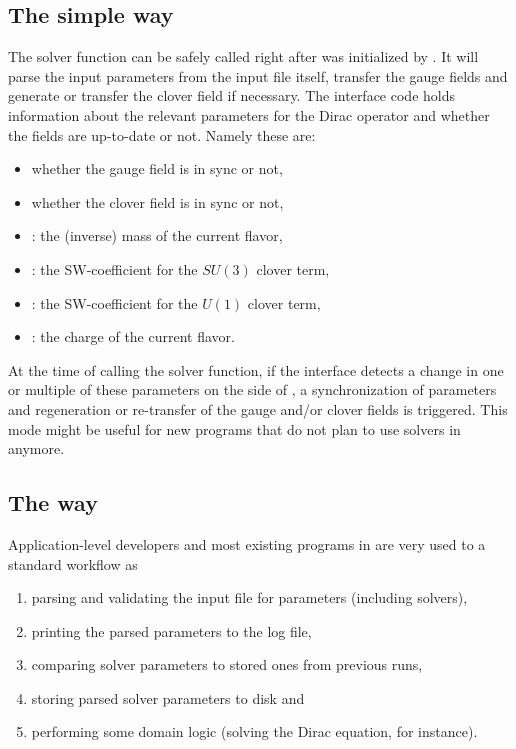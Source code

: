 \subsection{The simple way}
\label{sec:develop:sync:way}

The solver function  can be safely called right after \quda was initialized by .
It will parse the input parameters from the input file itself, transfer the gauge fields and generate or transfer the clover field if necessary.
The interface code holds information about the relevant parameters for the Dirac operator and whether the fields are up-to-date or not.
Namely these are:
\begin{itemize}
  \item whether the gauge field is in sync or not,
  \item whether the clover field is in sync or not,
  \item {}: the (inverse) mass of the current flavor,
  \item {}: the SW-coefficient for the $SU(3)$ clover term,
  \item {}: the SW-coefficient for the $U(1)$ clover term,
  \item {}: the charge of the current flavor.
\end{itemize}
At the time of calling the solver function, if the interface detects a change in one or multiple of these parameters on the side of \openqxd, a synchronization of parameters and regeneration or re-transfer of the gauge and/or clover fields is triggered.
This mode might be useful for new programs that do not plan to use solvers in \openqxd anymore.

\subsection{The \openqcd way}
\label{sec:develop:openqcd:way}

Application-level developers and most existing programs in \openqxd are very used to a standard workflow as
\begin{enumerate}
  \item parsing and validating the input file for parameters (including solvers),
  \item printing the parsed parameters to the log file,
  \item comparing solver parameters to stored ones from previous runs,
  \item storing parsed solver parameters to disk and
  \item performing some domain logic (solving the Dirac equation, for instance).
\end{enumerate}

